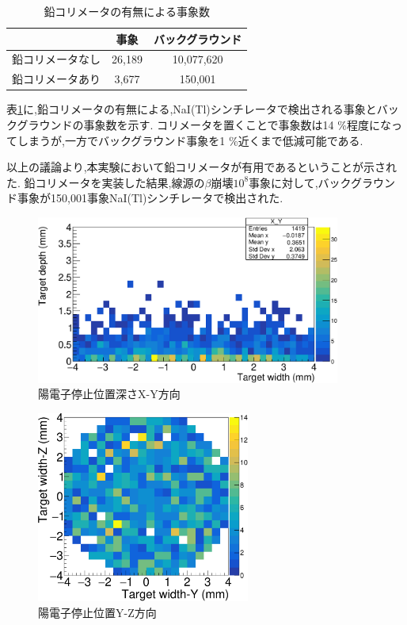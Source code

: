 \begin{table}[!tbp]
	\centering
	\caption{鉛コリメータの有無による事象数}
		\label{table_test2}	
	  \begin{tabular}{ccc} 
		\hline
		   				&事象& バックグラウンド \\ 
		\hline \hline
		鉛コリメータなし & 26,189 & 10,077,620 \\
		鉛コリメータあり & 3,677  & 150,001   \\
		\hline
	  \end{tabular}
\end{table}

表\ref{table_test2}に,鉛コリメータの有無による,NaI(Tl)シンチレータで検出される事象とバックグラウンドの事象数を示す.
コリメータを置くことで事象数は14 \%程度になってしまうが,一方でバックグラウンド事象を1 \%近くまで低減可能である.

以上の議論より,本実験において鉛コリメータが有用であるということが示された.
鉛コリメータを実装した結果,線源の$\beta$崩壊$10^8$事象に対して,バックグラウンド事象が150,001事象NaI(Tl)シンチレータで検出された.

\begin{figure}[!tbp]
	\centering
		\includegraphics[width=10cm]{fig/test2bXY.pdf}
	\caption{陽電子停止位置深さX-Y方向}
	\label{test2bXY}
\end{figure}

\begin{figure}[!tbp]
	\centering
		\includegraphics[width=7cm]{fig/test2bYZ.pdf}
	\caption{陽電子停止位置Y-Z方向}
	\label{test2bYZ}
\end{figure}




